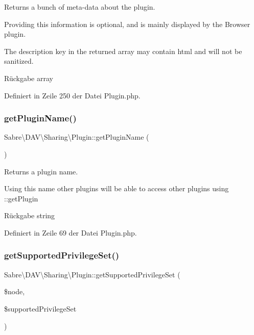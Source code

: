 Returns a bunch of meta-\/data about the plugin.

Providing this information is optional, and is mainly displayed by the Browser plugin.

The description key in the returned array may contain html and will not be sanitized.

\begin{DoxyReturn}{Rückgabe}
array 
\end{DoxyReturn}


Definiert in Zeile 250 der Datei Plugin.\+php.

\mbox{\label{class_sabre_1_1_d_a_v_1_1_sharing_1_1_plugin_a32d38f7f07a6ea3eaa3c6b0d791c57bd}} 
\subsubsection{\texorpdfstring{get\+Plugin\+Name()}{getPluginName()}}
{\footnotesize\ttfamily Sabre\textbackslash{}\+D\+A\+V\textbackslash{}\+Sharing\textbackslash{}\+Plugin\+::get\+Plugin\+Name (\begin{DoxyParamCaption}{ }\end{DoxyParamCaption})}

Returns a plugin name.

Using this name other plugins will be able to access other plugins using \+::get\+Plugin

\begin{DoxyReturn}{Rückgabe}
string 
\end{DoxyReturn}


Definiert in Zeile 69 der Datei Plugin.\+php.

\mbox{\label{class_sabre_1_1_d_a_v_1_1_sharing_1_1_plugin_a6816434e0bb16720f32d12ea962aaa4b}} 
\subsubsection{\texorpdfstring{get\+Supported\+Privilege\+Set()}{getSupportedPrivilegeSet()}}
{\footnotesize\ttfamily Sabre\textbackslash{}\+D\+A\+V\textbackslash{}\+Sharing\textbackslash{}\+Plugin\+::get\+Supported\+Privilege\+Set (\begin{DoxyParamCaption}\item[{\mbox{\hyperlink{interface_sabre_1_1_d_a_v_1_1_i_node}{I\+Node}}}]{\$node,  }\item[{array \&}]{\$supported\+Privilege\+Set }\end{DoxyParamCaption})}

